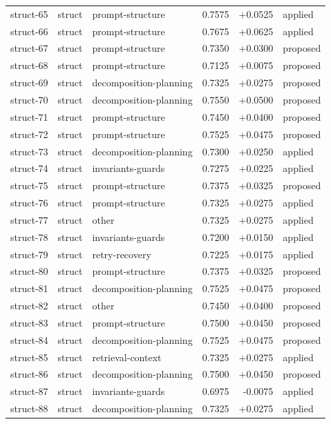 \begin{center}
\begin{longtable}{llp{5.2cm}rrl}
struct-65 & struct & prompt-structure & 0.7575 & +0.0525 & applied \\
struct-66 & struct & prompt-structure & 0.7675 & +0.0625 & applied \\
struct-67 & struct & prompt-structure & 0.7350 & +0.0300 & proposed \\
struct-68 & struct & prompt-structure & 0.7125 & +0.0075 & proposed \\
struct-69 & struct & decomposition-planning & 0.7325 & +0.0275 & proposed \\
struct-70 & struct & decomposition-planning & 0.7550 & +0.0500 & proposed \\
struct-71 & struct & prompt-structure & 0.7450 & +0.0400 & proposed \\
struct-72 & struct & prompt-structure & 0.7525 & +0.0475 & proposed \\
struct-73 & struct & decomposition-planning & 0.7300 & +0.0250 & applied \\
struct-74 & struct & invariants-guards & 0.7275 & +0.0225 & applied \\
struct-75 & struct & prompt-structure & 0.7375 & +0.0325 & proposed \\
struct-76 & struct & prompt-structure & 0.7325 & +0.0275 & applied \\
struct-77 & struct & other & 0.7325 & +0.0275 & applied \\
struct-78 & struct & invariants-guards & 0.7200 & +0.0150 & applied \\
struct-79 & struct & retry-recovery & 0.7225 & +0.0175 & applied \\
struct-80 & struct & prompt-structure & 0.7375 & +0.0325 & proposed \\
struct-81 & struct & decomposition-planning & 0.7525 & +0.0475 & proposed \\
struct-82 & struct & other & 0.7450 & +0.0400 & proposed \\
struct-83 & struct & prompt-structure & 0.7500 & +0.0450 & proposed \\
struct-84 & struct & decomposition-planning & 0.7525 & +0.0475 & proposed \\
struct-85 & struct & retrieval-context & 0.7325 & +0.0275 & applied \\
struct-86 & struct & decomposition-planning & 0.7500 & +0.0450 & proposed \\
struct-87 & struct & invariants-guards & 0.6975 & -0.0075 & applied \\
struct-88 & struct & decomposition-planning & 0.7325 & +0.0275 & applied \\

\end{longtable}
\end{center}
